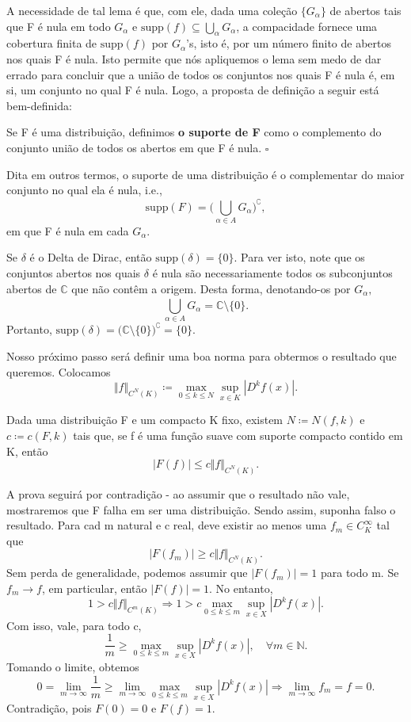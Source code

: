 \documentclass[MeasureTheory/measure_theory.tex]{subfiles}
\begin{document}
A necessidade de tal lema é que, com ele, dada uma coleção \(\{G_{\alpha }\}\) de abertos tais que F é nula em todo \(G_{\alpha }\) e \(\mathrm{supp}(f)\subseteq \bigcup_{\alpha }^{}G_{\alpha }\), a compacidade fornece uma cobertura finita de
\(\mathrm{supp}(f)\) por \(G_{\alpha }\)'s, isto é, por um número finito de abertos nos quais F é nula. Isto permite que nós apliquemos o lema sem medo de dar errado para concluir que a união de todos os conjuntos nos quais F é nula é, em si, um conjunto
no qual F é nula. Logo, a proposta de definição a seguir está bem-definida:
\begin{def*}
	Se F é uma distribuição, definimos \textbf{o suporte de F} como o complemento do conjunto união de todos os abertos em que F é nula. \(\square\)
\end{def*}
Dita em outros termos, o suporte de uma distribuição é o complementar do maior conjunto no qual ela é nula, i.e.,
\[
	\mathrm{supp}(F) = \biggl(\bigcup_{\alpha \in A}^{}G_{\alpha }\biggr)^{\complement},
\]
em que F é nula em cada \(G_{\alpha }\).
\begin{example}
	Se \(\delta \) é o Delta de Dirac, então \(\mathrm{supp}(\delta ) = \{0\}\). Para ver isto, note que os conjuntos abertos nos quais \(\delta \) é nula são necessariamente todos os subconjuntos abertos de \(\mathbb{C}\) que não contêm a origem. Desta forma, denotando-os por \(G_{\alpha },\)
	\[
		\bigcup_{\alpha \in A}^{}G_{\alpha } = \mathbb{C}\setminus{\{0\}}.
	\]
	Portanto, \(\mathrm{supp}(\delta ) = \biggl(\mathbb{C}\setminus{\{0\}}\biggr)^{\complement} = \{0\}.\)
\end{example}
Nosso próximo passo será definir uma boa norma para obtermos o resultado que queremos. Colocamos
\[
	\Vert f \Vert_{C^{N}(K)} \coloneqq \max_{0\leq k\leq N}\sup_{x\in K}|D^{k}f(x)|.
\]
\begin{prop*}
	Dada uma distribuição F e um compacto K fixo, existem \(N\coloneqq N(f, k)\) e \(c\coloneqq c(F, k)\) tais que, se f é uma função suave com suporte compacto contido em K, então
	\[
		|F(f)|\leq c\Vert f \Vert_{C^{N}(K)}.
	\]
\end{prop*}
\begin{proof*}
	A prova seguirá por contradição - ao assumir que o resultado não vale, mostraremos que F falha em ser uma distribuição. Sendo assim, suponha falso o resultado. Para cad m natural e c real, deve existir ao menos uma \(f_{m}\in C_{K}^{\infty}\) tal que
	\[
		|F(f_{m})| \geq c\Vert f \Vert_{C^{N}(K)}.
	\]
	Sem perda de generalidade, podemos assumir que \(|F(f_{m})| = 1\) para todo m. Se \(f_{m}\to f\), em particular, então \(|F(f)| = 1.\) No entanto,
	\[
		1 > c \Vert f \Vert_{C^{m}(K)}\Rightarrow 1 > c \max_{0 \leq k \leq m}\sup_{x\in X}|D^{k}f(x)|.
	\]
	Com isso, vale, para todo c,
	\[
		\frac{1}{m}\geq \max_{0 \leq k \leq m}\sup_{x\in X}|D^{k}f(x)|,\quad \forall m\in \mathbb{N}.
	\]
	Tomando o limite, obtemos
	\[
		0 = \lim_{m\to \infty}\frac{1}{m} \geq \lim_{m\to \infty}\max_{0\leq k\leq m}\sup_{x\in X}|D^{k}f(x)| \Rightarrow \lim_{m\to \infty}f_{m} = f = 0.
	\]
	Contradição, pois \(F(0) = 0\) e \(F(f) = 1\). \qedsymbol
\end{proof*}
\end{document}
